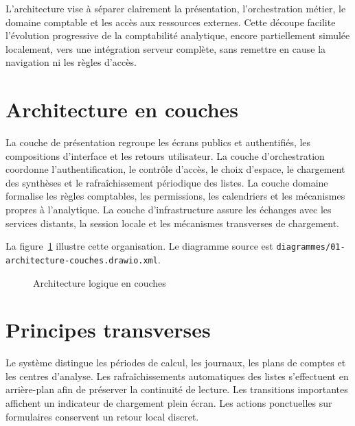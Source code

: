 \documentclass[12pt,a4paper]{report}
\begin{document}
L'architecture vise à séparer clairement la présentation, l'orchestration métier, le domaine comptable et les accès aux ressources externes. Cette découpe facilite l'évolution progressive de la comptabilité analytique, encore partiellement simulée localement, vers une intégration serveur complète, sans remettre en cause la navigation ni les règles d'accès.

\section{Architecture en couches}

La couche de présentation regroupe les écrans publics et authentifiés, les compositions d'interface et les retours utilisateur. La couche d'orchestration coordonne l'authentification, le contrôle d'accès, le choix d'espace, le chargement des synthèses et le rafraîchissement périodique des listes. La couche domaine formalise les règles comptables, les permissions, les calendriers et les mécanismes propres à l'analytique. La couche d'infrastructure assure les échanges avec les services distants, la session locale et les mécanismes transverses de chargement.

La figure~\ref{fig:arch-couches} illustre cette organisation. Le diagramme source est \texttt{diagrammes/01-architecture-couches.drawio.xml}.

\begin{figure}[htbp]
\centering
{}
\caption{Architecture logique en couches}
\label{fig:arch-couches}
\end{figure}

\section{Principes transverses}

Le système distingue les périodes de calcul, les journaux, les plans de comptes et les centres d'analyse. Les rafraîchissements automatiques des listes s'effectuent en arrière-plan afin de préserver la continuité de lecture. Les transitions importantes affichent un indicateur de chargement plein écran. Les actions ponctuelles sur formulaires conservent un retour local discret.
\end{document}
